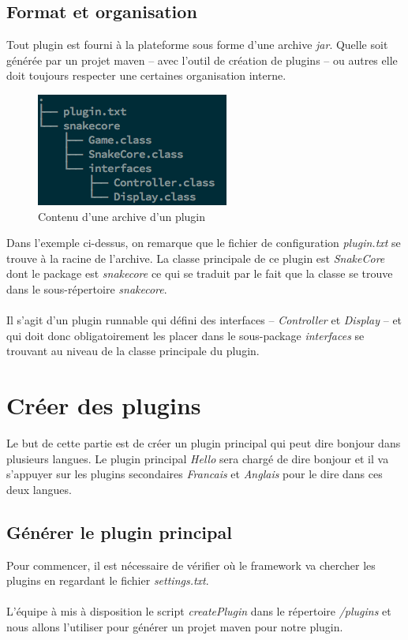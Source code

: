\documentclass[12pt,a4paper]{article}
\begin{document}
\subsection{Format et organisation}
Tout plugin est fourni à la plateforme sous forme d'une archive \emph{jar}. Quelle 
soit générée par un projet maven -- avec l'outil de création de plugins -- ou autres 
elle doit toujours respecter une certaines organisation interne.

\begin{figure}[h]
   \centering
   \includegraphics{ressources/plugin-organization.png}
   \caption{Contenu d'une archive d'un plugin}
\end{figure}

Dans l'exemple ci-dessus, on remarque que le fichier de configuration 
\emph{plugin.txt} se trouve à la racine de l'archive. La classe principale de ce 
plugin est \emph{SnakeCore} dont le package est \emph{snakecore} ce qui se traduit 
par le fait que la classe se trouve dans le sous-répertoire \emph{snakecore}.
\\\\
Il s'agit d'un plugin runnable qui défini des interfaces -- \emph{Controller} et 
\emph{Display} -- et qui doit donc obligatoirement les placer dans le sous-package 
\emph{interfaces} se trouvant au niveau de la classe principale du plugin.

\section{Créer des plugins}
Le but de cette partie est de créer un plugin principal qui peut dire bonjour dans 
plusieurs langues. Le plugin principal \emph{Hello} sera chargé de dire bonjour et 
il va s'appuyer sur les plugins secondaires \emph{Francais} et \emph{Anglais} pour 
le dire dans ces deux langues.

\subsection{Générer le plugin principal}
Pour commencer, il est nécessaire de vérifier où le framework va chercher les 
plugins en regardant le fichier \emph{settings.txt}.
\\\\
L'équipe à mis à disposition le script \emph{createPlugin} dans le répertoire 
\emph{/plugins} et nous allons l'utiliser pour générer un projet maven pour notre 
plugin.
\end{document}
